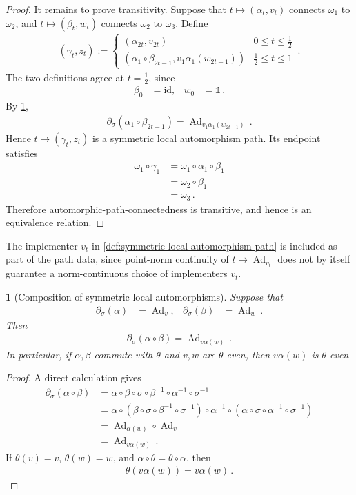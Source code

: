 \documentclass[a4paper,10pt]{article}
\numberwithin{equation}{section}
\theoremstyle{plain}
\theoremstyle{plain}
\newtheorem{lem}[lem]{\protect\lemmaname}
\theoremstyle{plain}
\theoremstyle{plain}
\theoremstyle{plain}
\theoremstyle{remark}
\theoremstyle{definition}
\providecommand{\lemmaname}{Lemma}
\newcommand{\Ad}[1]{\operatorname{Ad}_{#1}}
\newcommand{\Id}{\mathds{1}}
\newcommand{\eq}[1]{\begin{align*}#1\end{align*}}
\newcommand{\eql}[1]{\begin{align}#1\end{align}}
\newcommand{\onehalf}{\frac{1}{2}}
\newcommand{\br}[1]{\left(#1\right)}
\begin{document}
\begin{proof}
It remains to prove transitivity. Suppose that
\(t\mapsto(\alpha_t,v_t)\) connects \(\omega_1\) to \(\omega_2\), and
\(t\mapsto(\beta_t,w_t)\) connects \(\omega_2\) to \(\omega_3\).
Define
\eq{
    (\gamma_t,z_t)
    :=
    \begin{cases}
        \br{
            \alpha_{2t},
            v_{2t}
        }
        &
        0\leq t\leq\onehalf\\[2mm]
        \br{
            \alpha_1\circ\beta_{2t-1},
            v_1\alpha_1(w_{2t-1})
        }
        &
        \onehalf\leq t\leq1
    \end{cases}\,.
}
The two definitions agree at \(t=\onehalf\), since
\eq{
    \beta_0
    &=
    \mathrm{id},&
    w_0
    &=
    \Id\,.
}
By \cref{lem:composition of symmetric local automorphisms},
\eq{
    \partial_\sigma
    \br{
        \alpha_1\circ\beta_{2t-1}
    }
    =
    \Ad{
        v_1\alpha_1(w_{2t-1})
    }\,.
}
Hence \(t\mapsto(\gamma_t,z_t)\) is a symmetric local automorphism
path. Its endpoint satisfies
\eq{
    \omega_1\circ\gamma_1
    &=
    \omega_1\circ\alpha_1\circ\beta_1\\
    &=
    \omega_2\circ\beta_1\\
    &=
    \omega_3\,.
}
Therefore automorphic-path-connectedness is transitive, and hence is
an equivalence relation.
\end{proof}

The implementer \(v_t\) in
\cref{def:symmetric local automorphism path} is included as part of the
path data, since point-norm continuity of \(t\mapsto\Ad{v_t}\) does not
by itself guarantee a norm-continuous choice of implementers \(v_t\).

\begin{lem}[Composition of symmetric local automorphisms]
\label{lem:composition of symmetric local automorphisms}
Suppose that
\eq{
    \partial_\sigma(\alpha)
    &=
    \Ad{v},&
    \partial_\sigma(\beta)
    &=
    \Ad{w}\,.
}
Then
\eql{
    \partial_\sigma(\alpha\circ\beta)
    =
    \Ad{v\alpha(w)}\,.
}
In particular, if \(\alpha,\beta\) commute with \(\theta\) and \(v,w\)
are \(\theta\)-even, then \(v\alpha(w)\) is \(\theta\)-even
\end{lem}

\begin{proof}
A direct calculation gives
\eq{
    \partial_\sigma(\alpha\circ\beta)
    &=
    \alpha\circ\beta\circ\sigma\circ
    \beta^{-1}\circ\alpha^{-1}\circ\sigma^{-1}
    \\
    &=
    \alpha\circ
    \left(
        \beta\circ\sigma\circ\beta^{-1}\circ\sigma^{-1}
    \right)
    \circ\alpha^{-1}
    \circ
    \left(
        \alpha\circ\sigma\circ\alpha^{-1}\circ\sigma^{-1}
    \right)
    \\
    &=
    \Ad{\alpha(w)}\circ\Ad{v}
    \\
    &=
    \Ad{v\alpha(w)}\,.
}
If \(\theta(v)=v\), \(\theta(w)=w\), and
\(\alpha\circ\theta=\theta\circ\alpha\), then
\eq{
    \theta\left(v\alpha(w)\right)
    =
    v\alpha(w)\,.
}
\end{proof}
\end{document}
